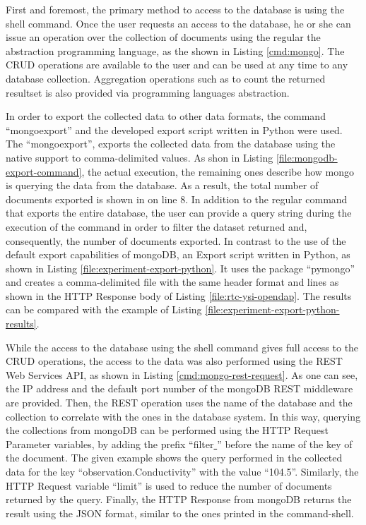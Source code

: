 First and foremost, the primary method to access to the database is using the
shell command. Once the user requests an access to the database, he or she can
issue an operation over the collection of documents using the regular the
abstraction programming language, as the shown in Listing \ref{cmd:mongo}. The
CRUD operations are available to the user and can be used at any time to any
database collection. Aggregation operations such as to count the returned
resultset is also provided via programming languages abstraction.

In order to export the collected data to other data formats, the  command
``mongoexport'' and the developed export script written in Python were used.
The ``mongoexport'', exports the collected data from the database using the
native support to comma-delimited values. As shon in Listing
\ref{file:mongodb-export-command}, the actual execution, the remaining ones
describe how mongo is querying the data from the database. As a result, the
total number of documents exported is shown in on line 8. In addition to the
regular command that exports the entire database, the user can provide a query
string during the execution of the command in order to filter the dataset
returned and, consequently, the number of documents exported. In contrast to
the use of the default export capabilities of mongoDB, an Export script written
in Python, as shown in Listing \ref{file:experiment-export-python}. It uses the
package ``pymongo'' and creates a comma-delimited file with the same header
format and lines as shown in the HTTP Response body of Listing
\ref{file:rtc-ysi-opendap}. The results can be compared with the example of
Listing \ref{file:experiment-export-python-results}.

While the access to the database using the shell command gives full access to 
the CRUD operations, the access to the data was also performed using the REST
Web Services API, as shown in Listing \ref{cmd:mongo-rest-request}. As one can
see, the IP address and the default port number of the mongoDB REST middleware
are provided. Then, the REST operation uses the name of the database and
the collection to correlate with the ones in the database system. In this way,
querying the collections from mongoDB can be performed using the HTTP Request
Parameter variables, by adding the prefix ``filter\underline{ }'' before the
name of the key of the document. The given example shows the query performed in the
collected data for the key ``observation.Conductivity'' with the value
``104.5''. Similarly, the HTTP Request variable ``limit'' is used to reduce
the number of documents returned by the query. Finally, the HTTP Response from
mongoDB returns the result using the JSON format, similar to the ones printed
in the command-shell.

